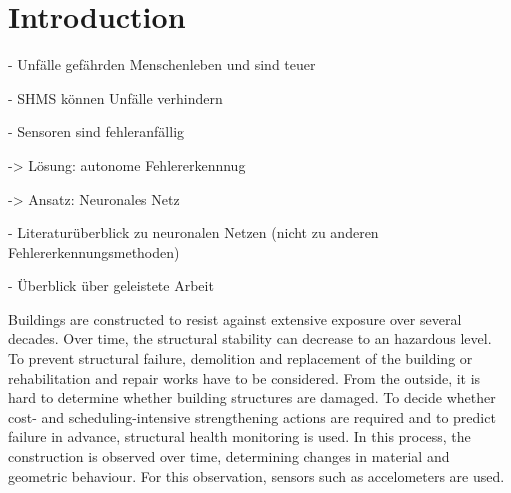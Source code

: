 \documentclass[12pt]{article}
\newenvironment{sciabstract}{%
\begin{quote} \bf}
{\end{quote}}
\begin{document}
\begin{sciabstract}




\end{sciabstract}

\section*{Introduction}

- Unfälle gefährden Menschenleben und sind teuer

- SHMS können Unfälle verhindern

- Sensoren sind fehleranfällig

-> Lösung: autonome Fehlererkennnug 

-> Ansatz: Neuronales Netz

- Literaturüberblick zu neuronalen Netzen (nicht zu anderen Fehlererkennungsmethoden)

- Überblick über geleistete Arbeit





Buildings are constructed to resist against extensive exposure over several decades. 
Over time, the structural stability can decrease to an hazardous level. 
To prevent structural failure, demolition and replacement of the building or rehabilitation and repair works have to be considered.
 From the outside, it is hard to determine whether building structures are damaged.
To decide whether cost- and scheduling-intensive strengthening actions are required and to predict failure in advance, structural health monitoring is used. 
In this process, the construction is observed over time, determining changes in material and geometric behaviour. 
For this observation, sensors such as accelometers are used.
\end{document}
